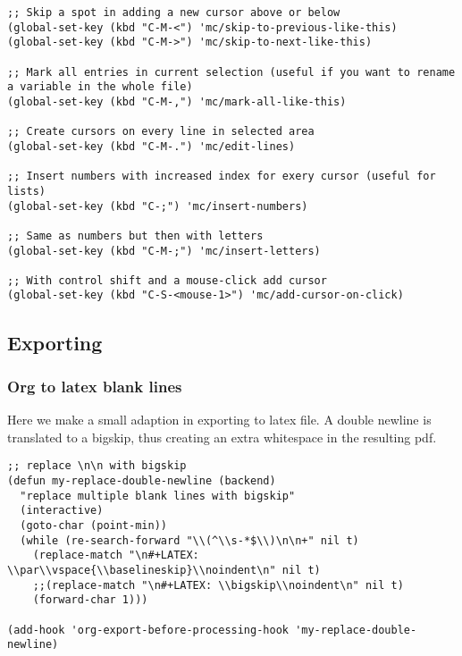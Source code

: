 \documentclass[11pt]{article}
\begin{document}
\begin{verbatim}
;; Skip a spot in adding a new cursor above or below
(global-set-key (kbd "C-M-<") 'mc/skip-to-previous-like-this)
(global-set-key (kbd "C-M->") 'mc/skip-to-next-like-this)

;; Mark all entries in current selection (useful if you want to rename a variable in the whole file)
(global-set-key (kbd "C-M-,") 'mc/mark-all-like-this)

;; Create cursors on every line in selected area
(global-set-key (kbd "C-M-.") 'mc/edit-lines)

;; Insert numbers with increased index for exery cursor (useful for lists)
(global-set-key (kbd "C-;") 'mc/insert-numbers)

;; Same as numbers but then with letters
(global-set-key (kbd "C-M-;") 'mc/insert-letters)

;; With control shift and a mouse-click add cursor
(global-set-key (kbd "C-S-<mouse-1>") 'mc/add-cursor-on-click)
\end{verbatim}
\subsection{Exporting}
\label{sec:org9b004c8}
\subsubsection{Org to latex blank lines}
\label{sec:org4b1d6a5}
Here we make a small adaption in exporting to latex file. A double newline is translated to a bigskip, thus creating an extra whitespace in the resulting pdf.
\begin{verbatim}
;; replace \n\n with bigskip
(defun my-replace-double-newline (backend)
  "replace multiple blank lines with bigskip"
  (interactive)
  (goto-char (point-min))
  (while (re-search-forward "\\(^\\s-*$\\)\n\n+" nil t)
    (replace-match "\n#+LATEX: \\par\\vspace{\\baselineskip}\\noindent\n" nil t)
    ;;(replace-match "\n#+LATEX: \\bigskip\\noindent\n" nil t)
    (forward-char 1)))

(add-hook 'org-export-before-processing-hook 'my-replace-double-newline)
\end{verbatim}
\end{document}
